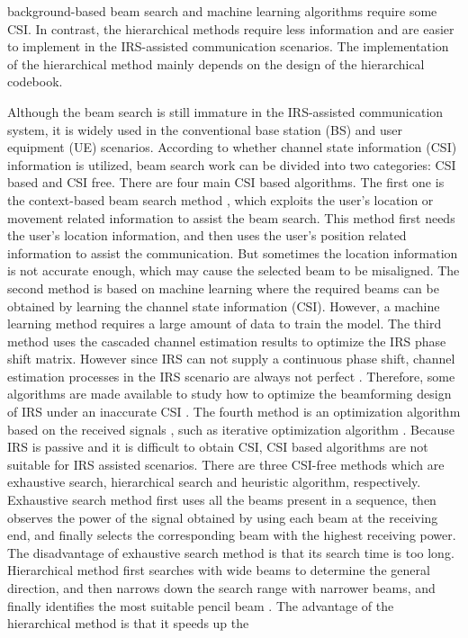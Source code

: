 \documentclass[12pt,draftclsnofoot,onecolumn]{IEEEtran}
\begin{document}
background-based beam search and machine learning algorithms  require some CSI. In contrast, the  hierarchical methods require less information and are easier to implement in the IRS-assisted communication scenarios. The implementation of the hierarchical  method mainly depends on the design of the hierarchical codebook.

	Although the beam search is still immature in the IRS-assisted communication system, it is widely used in the conventional base station (BS) and user equipment (UE) scenarios.  According to whether channel state information (CSI) information is utilized, beam search work can be divided into two categories: CSI based and CSI free. There are four main CSI based algorithms. The first one is the context-based beam search method \cite{DBLP:journals/cm/GiordaniMZ16,DBLP:journals/corr/abs-1711-05456,DBLP:conf/iccchina/LuLDFHG21}, which exploits the user's location or movement related information to assist the  beam search. This method first  needs the user's location information, and then uses the user's position related information  to assist the communication. But sometimes the location information is not accurate enough, which may  cause the selected beam to be misaligned. The second  method is based on machine learning \cite{DBLP:conf/wowmom/DevotiFC18, DBLP:conf/wcnc/ChenCW18, DBLP:journals/access/AlkhateebAVLQT18} where the required beams can be obtained by learning the channel state information (CSI). However, a machine learning method  requires a large amount of data to train the model. The third method uses the  cascaded channel estimation results to optimize the  IRS phase shift matrix. However since IRS can not  supply a continuous phase shift, channel estimation processes  in the  IRS scenario are always not perfect \cite{DBLP:journals/jsac/YouZZ20}. Therefore, some algorithms are made available to study how to optimize the beamforming design of IRS under an inaccurate CSI \cite{DBLP:journals/twc/Papazafeiropoulos22,DBLP:journals/wcl/ZhengZ20,DBLP:journals/wcl/ZhiPRW21a,DBLP:journals/icl/Zhang0Z020,DBLP:journals/twc/ZhengYZ20}. The fourth  method is an optimization algorithm based on the  received signals \cite{DBLP:journals/tcom/WangLJYW21, DBLP:journals/icl/OmidSPDN22,DBLP:journals/jsac/YanYHK20}, such as iterative optimization algorithm \cite{DBLP:journals/twc/PerovicTRF21}.  Because IRS is passive and it is difficult to obtain CSI, CSI based algorithms are not suitable for IRS assisted scenarios. There are three CSI-free methods which are  exhaustive search, hierarchical search and heuristic algorithm, respectively. Exhaustive search method \cite{DBLP:conf/wcnc/WeiLW17} first uses all the beams present in a sequence, then observes the power of the signal obtained by using each beam at the receiving end, and finally selects the corresponding  beam with the highest receiving power. The disadvantage of exhaustive search method is that its search time is too long. Hierarchical method first searches with wide beams to determine the general direction, and then narrows down the search range with narrower beams, and finally identifies the most suitable pencil beam \cite{DBLP:journals/twc/XiaoHXX16,DBLP:journals/wcl/MeiZ21}. The advantage of the hierarchical  method is that it  speeds up the 
\end{document}

